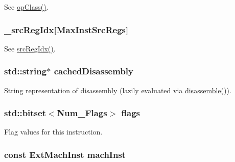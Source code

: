 See \hyperlink{classStaticInst_aa4919f97cae20d4d82391c1fc6d5fda6}{opClass()}. \hypertarget{classStaticInst_aa053ba73e4ceeefc0fca46c6791e6a53}{
\subsubsection[{\_\-srcRegIdx}]{ {\bf \_\-srcRegIdx}\mbox{[}MaxInstSrcRegs\mbox{]}}}
\label{classStaticInst_aa053ba73e4ceeefc0fca46c6791e6a53}


See \hyperlink{classStaticInst_a9353aea3dfe673b88a4a96163d58759f}{srcRegIdx()}. \hypertarget{classStaticInst_aca407a93c3360ff06d5d52f92583a6e1}{
\subsubsection[{cachedDisassembly}]{\setlength{\rightskip}{0pt plus 5cm}std::string$\ast$ {\bf cachedDisassembly}}}
\label{classStaticInst_aca407a93c3360ff06d5d52f92583a6e1}
String representation of disassembly (lazily evaluated via \hyperlink{classStaticInst_acce45da56f8154aec68848514c4f819f}{disassemble()}). \hypertarget{classStaticInst_a0bf9c8a3dba6ab3f4a4b1bee48ebd0be}{
\subsubsection[{flags}]{\setlength{\rightskip}{0pt plus 5cm}std::bitset$<$Num\_\-Flags$>$ {\bf flags}}}
\label{classStaticInst_a0bf9c8a3dba6ab3f4a4b1bee48ebd0be}


Flag values for this instruction. \hypertarget{classStaticInst_a744598b194ca3d4201d9414ce4cc4af4}{
\subsubsection[{machInst}]{\setlength{\rightskip}{0pt plus 5cm}const {\bf ExtMachInst} {\bf machInst}}}
\label{classStaticInst_a744598b194ca3d4201d9414ce4cc4af4}


